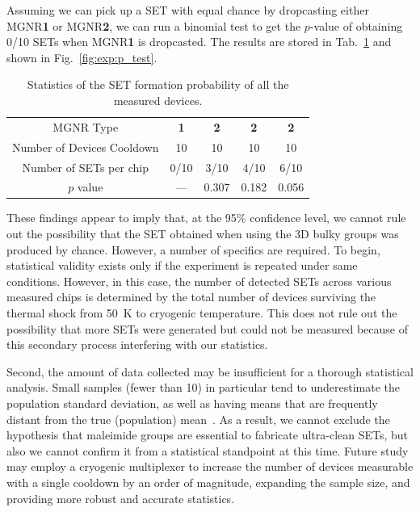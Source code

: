 Assuming we can pick up a SET with equal chance by dropcasting either \gls{MGNR}\textbf{1} or \gls{MGNR}\textbf{2}, we can run a binomial test to get the $p$-value of obtaining 0/10 \glspl{SET} when \gls{MGNR}\textbf{1} is dropcasted. The results are stored in Tab.~\ref{tab:p_values} and shown in Fig.~\ref{fig:exp:p_test}.
%
\begin{table}
    \caption{\label{tab:p_values} Statistics of the SET formation probability of all the measured devices.}
    \centering
    \begin{tabular}{ccccc}
        \hline MGNR Type           & \textbf{1} & \textbf{2} & \textbf{2} & \textbf{2}                           \\
        Number of Devices Cooldown & 10         & 10         & 10         & 10                                \T \\
        Number of SETs per chip    & 0/10       & 3/10       & 4/10       & 6/10                                 \\
        $p$ value                  & ---        & 0.307      & 0.182      & 0.056                                \\
        \hline
    \end{tabular}
\end{table}
%
These findings appear to imply that, at the 95\% confidence level, we cannot rule out the possibility that the SET obtained when using the 3D bulky groups was produced by chance. However, a number of specifics are required. To begin, statistical validity exists only if the experiment is repeated under same conditions. However, in this case, the number of detected \glspl{SET} across various measured chips is determined by the total number of devices surviving the thermal shock from \SI{50}{\kelvin} to cryogenic temperature. This does not rule out the possibility that more \glspl{SET} were generated but could not be measured because of this secondary process interfering with our statistics.

Second, the amount of data collected may be insufficient for a thorough statistical analysis. Small samples (fewer than 10) in particular tend to underestimate the population standard deviation, as well as having means that are frequently distant from the true (population) mean~\cite{reus2012statistical, reuter2012signatures}. As a result, we cannot exclude the hypothesis that maleimide groups are essential to fabricate ultra-clean \glspl{SET}, but also we cannot confirm it from a statistical standpoint at this time. Future study may employ a cryogenic multiplexer to increase the number of devices measurable with a single cooldown by an order of magnitude, expanding the sample size, and providing more robust and accurate statistics.


